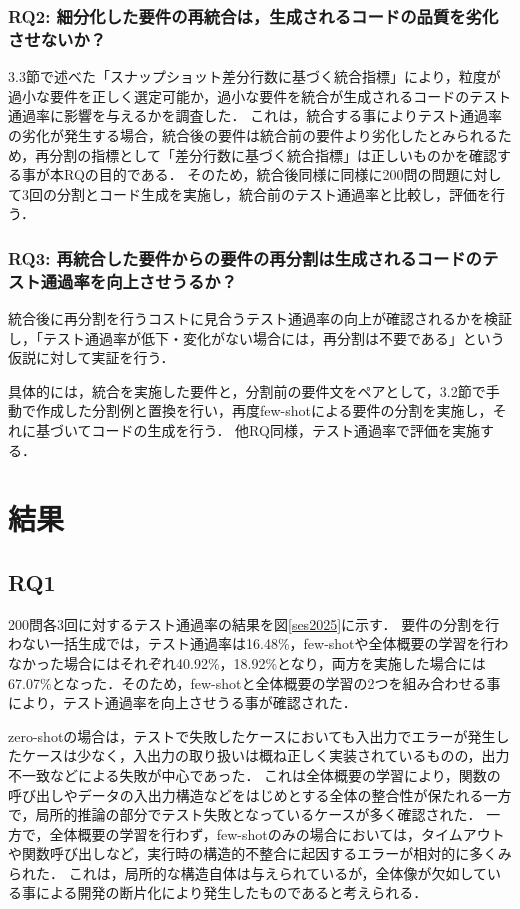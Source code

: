 \documentclass[submit,techrep,noauthor]{ipsj}
\begin{document}
\subsubsection{RQ2: 細分化した要件の再統合は，生成されるコードの品質を劣化させないか？}
3.3節で述べた「スナップショット差分行数に基づく統合指標」により，粒度が過小な要件を正しく選定可能か，過小な要件を統合が生成されるコードのテスト通過率に影響を与えるかを調査した．
これは，統合する事によりテスト通過率の劣化が発生する場合，統合後の要件は統合前の要件より劣化したとみられるため，再分割の指標として「差分行数に基づく統合指標」は正しいものかを確認する事が本RQの目的である．
そのため，統合後同様に同様に200問の問題に対して3回の分割とコード生成を実施し，統合前のテスト通過率と比較し，評価を行う．


\subsubsection{RQ3: 再統合した要件からの要件の再分割は生成されるコードのテスト通過率を向上させうるか？}
統合後に再分割を行うコストに見合うテスト通過率の向上が確認されるかを検証し，「テスト通過率が低下・変化がない場合には，再分割は不要である」という仮説に対して実証を行う．

具体的には，統合を実施した要件と，分割前の要件文をペアとして，3.2節で手動で作成した分割例と置換を行い，再度few-shotによる要件の分割を実施し，それに基づいてコードの生成を行う．
他RQ同様，テスト通過率で評価を実施する．

\section{結果}
\label{sec:result}

\subsection{RQ1}
200問各3回に対するテスト通過率の結果を図\ref{ses2025}に示す．
要件の分割を行わない一括生成では，テスト通過率は16.48\%，few-shotや全体概要の学習を行わなかった場合にはそれぞれ40.92\%，18.92\%となり，両方を実施した場合には67.07\%となった．そのため，few-shotと全体概要の学習の2つを組み合わせる事により，テスト通過率を向上させうる事が確認された．

zero-shotの場合は，テストで失敗したケースにおいても入出力でエラーが発生したケースは少なく，入出力の取り扱いは概ね正しく実装されているものの，出力不一致などによる失敗が中心であった．
これは全体概要の学習により，関数の呼び出しやデータの入出力構造などをはじめとする全体の整合性が保たれる一方で，局所的推論の部分でテスト失敗となっているケースが多く確認された．
一方で，全体概要の学習を行わず，few-shotのみの場合においては，タイムアウトや関数呼び出しなど，実行時の構造的不整合に起因するエラーが相対的に多くみられた．
これは，局所的な構造自体は与えられているが，全体像が欠如している事による開発の断片化により発生したものであると考えられる．
\end{document}
